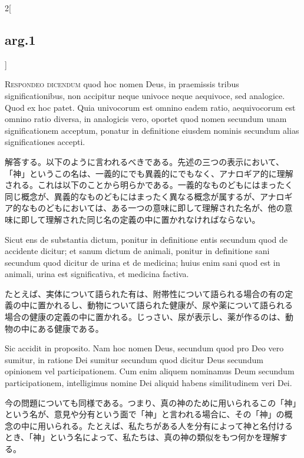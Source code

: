 \documentclass[paper=a4paper,fontsize=10pt,jafontsize=9pt,titlepage]{jlreq}
\begin{document}
\begin{paracol}{2}[\subsection{arg.1}]

{\scshape Respondeo dicendum} quod hoc nomen Deus, in praemissis
tribus significationibus, non accipitur neque univoce neque aequivoce,
sed analogice. Quod ex hoc patet. Quia univocorum est omnino eadem
ratio, aequivocorum est omnino ratio diversa, in analogicis vero,
oportet quod nomen secundum unam significationem acceptum, ponatur in
definitione eiusdem nominis secundum alias significationes accepti.

\switchcolumn

解答する。以下のように言われるべきである。先述の三つの表示において、
「神」というこの名は、一義的にでも異義的にでもなく、アナロギア的に理解
される。これは以下のことから明らかである。一義的なものどもにはまったく
同じ概念が、異義的なものどもにはまったく異なる概念が属するが、アナロギ
ア的なものどもにおいては、ある一つの意味に即して理解された名が、他の意
味に即して理解された同じ名の定義の中に置かれなければならない。

\switchcolumn*

Sicut ens de substantia dictum, ponitur in definitione entis secundum
quod de accidente dicitur; et sanum dictum de animali, ponitur in
definitione sani secundum quod dicitur de urina et de medicina; huius
enim sani quod est in animali, urina est significativa, et medicina
factiva.

\switchcolumn

たとえば、実体について語られた有は、附帯性について語られる場合の有の定
義の中に置かれるし、動物について語られた健康が、尿や薬について語られる
場合の健康の定義の中に置かれる。じっさい、尿が表示し、薬が作るのは、動
物の中にある健康である。

\switchcolumn*

Sic accidit in proposito. Nam hoc nomen Deus, secundum quod pro Deo
vero sumitur, in ratione Dei sumitur secundum quod dicitur Deus
secundum opinionem vel participationem. Cum enim aliquem nominamus
Deum secundum participationem, intelligimus nomine Dei aliquid habens
similitudinem veri Dei.

\switchcolumn

今の問題についても同様である。つまり、真の神のために用いられるこの「神」
という名が、意見や分有という面で「神」と言われる場合に、その「神」の概
念の中に用いられる。たとえば、私たちがある人を分有によって神と名付ける
とき、「神」という名によって、私たちは、真の神の類似をもつ何かを理解す
る。


\end{paracol}
\end{document}
